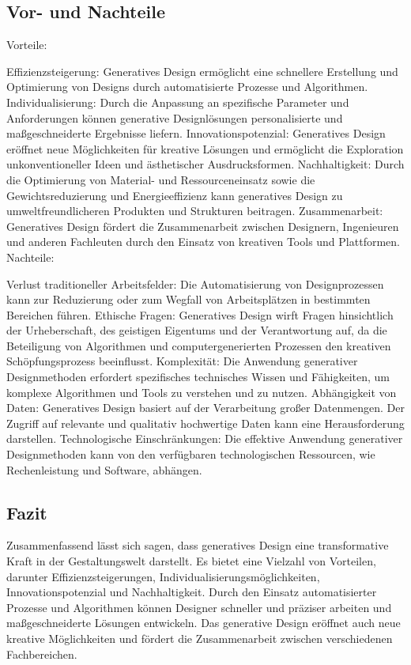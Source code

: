 \subsection*{Vor- und Nachteile}
 Vorteile:

 Effizienzsteigerung: Generatives Design ermöglicht eine schnellere Erstellung und Optimierung von Designs durch automatisierte Prozesse und Algorithmen.
 Individualisierung: Durch die Anpassung an spezifische Parameter und Anforderungen können generative Designlösungen personalisierte und maßgeschneiderte Ergebnisse liefern.
 Innovationspotenzial: Generatives Design eröffnet neue Möglichkeiten für kreative Lösungen und ermöglicht die Exploration unkonventioneller Ideen und ästhetischer Ausdrucksformen.
 Nachhaltigkeit: Durch die Optimierung von Material- und Ressourceneinsatz sowie die Gewichtsreduzierung und Energieeffizienz kann generatives Design zu umweltfreundlicheren Produkten und Strukturen beitragen.
 Zusammenarbeit: Generatives Design fördert die Zusammenarbeit zwischen Designern, Ingenieuren und anderen Fachleuten durch den Einsatz von kreativen Tools und Plattformen. \autocite{12} \autocite*{13}
 Nachteile:
 
 Verlust traditioneller Arbeitsfelder: Die Automatisierung von Designprozessen kann zur Reduzierung oder zum Wegfall von Arbeitsplätzen in bestimmten Bereichen führen.
 Ethische Fragen: Generatives Design wirft Fragen hinsichtlich der Urheberschaft, des geistigen Eigentums und der Verantwortung auf, da die Beteiligung von Algorithmen und computergenerierten Prozessen den kreativen Schöpfungsprozess beeinflusst.
 Komplexität: Die Anwendung generativer Designmethoden erfordert spezifisches technisches Wissen und Fähigkeiten, um komplexe Algorithmen und Tools zu verstehen und zu nutzen.
 Abhängigkeit von Daten: Generatives Design basiert auf der Verarbeitung großer Datenmengen. Der Zugriff auf relevante und qualitativ hochwertige Daten kann eine Herausforderung darstellen.
 Technologische Einschränkungen: Die effektive Anwendung generativer Designmethoden kann von den verfügbaren technologischen Ressourcen, wie Rechenleistung und Software, abhängen. \autocite*{13}

 \subsection*{Fazit}

 Zusammenfassend lässt sich sagen, dass generatives Design eine transformative Kraft in der Gestaltungswelt darstellt. Es bietet eine Vielzahl von Vorteilen, darunter Effizienzsteigerungen, Individualisierungsmöglichkeiten, Innovationspotenzial und Nachhaltigkeit. Durch den Einsatz automatisierter Prozesse und Algorithmen können Designer schneller und präziser arbeiten und maßgeschneiderte Lösungen entwickeln. Das generative Design eröffnet auch neue kreative Möglichkeiten und fördert die Zusammenarbeit zwischen verschiedenen Fachbereichen.

